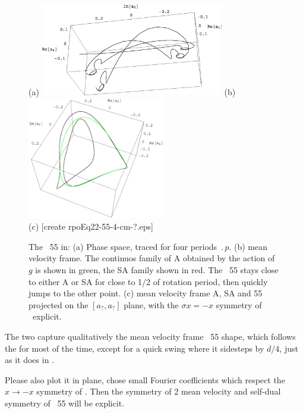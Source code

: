 \begin{figure}[t] %
\centering
(a) \includegraphics[width=8.0cm]{figs/rpo22-55-4-clean.eps}
%
\hspace{0.1in}
(b) \includegraphics[width=6.0cm]{figs/rpoEq22-55-4-cm.eps}
\\
(c) [create rpoEq22-55-4-cm-?.eps]
\caption{
 The \rpo\ {\nameit}55 in: 
 (a) Phase space, traced for four periods $\period{p}$.
 (b) mean velocity frame. 
        The continuos family of 
	{\eqva} A obtained by the action of $g$ is shown in green,
	the SA family shown in red. The \rpo\ {\nameit}55 stays close
	to either A or SA for close to 1/2 of {\eqv} rotation
	period, then quickly jumps to the other {\eqv} point.
 (c) mean velocity frame A, SA and {\nameit}55 projected on the 
	$[a_?,a_?]$ plane,
	with the $\sigma x = -x$ symmetry of \KSe\ explicit.
        }
\label{f:rpo55}
\end{figure}


The two {\eqva}
capture qualitatively the mean velocity frame \rpo\ {\nameit}55 shape,
which follows the
{\eqv} for most of the time, except for a quick swing where it
sidesteps by $d/4$, just as it does in . 

Please also plot it in plane, chose small Fourier coefficients
 which respect the $x \to -x$ symmetry of \KSe.
Then the symmetry of 2 mean velocity
{\eqva} and self-dual symmetry of \rpo\ {\nameit}55 will be explicit.

